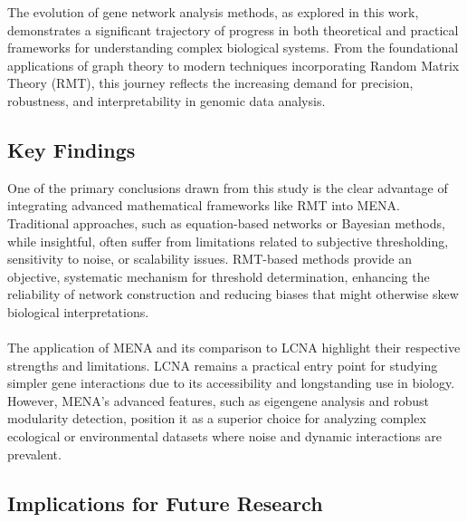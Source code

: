 The evolution of gene network analysis methods, as explored in this work, demonstrates a significant trajectory of progress in both theoretical and practical frameworks for understanding complex biological systems.
From the foundational applications of graph theory to modern techniques incorporating Random Matrix Theory (RMT), this journey reflects the increasing demand for precision, robustness, and interpretability in genomic data analysis.


\subsection*{Key Findings}

One of the primary conclusions drawn from this study is the clear advantage of integrating advanced mathematical frameworks like RMT into MENA\@.
Traditional approaches, such as equation-based networks or Bayesian methods, while insightful, often suffer from limitations related to subjective thresholding, sensitivity to noise, or scalability issues.
RMT-based methods provide an objective, systematic mechanism for threshold determination, enhancing the reliability of network construction and reducing biases that might otherwise skew biological interpretations.
\\\\
\noindent The application of MENA and its comparison to LCNA highlight their respective strengths and limitations.
LCNA remains a practical entry point for studying simpler gene interactions due to its accessibility and longstanding use in biology.
However, MENA’s advanced features, such as eigengene analysis and robust modularity detection, position it as a superior choice for analyzing complex ecological or environmental datasets where noise and dynamic interactions are prevalent.

\subsection*{Implications for Future Research}

